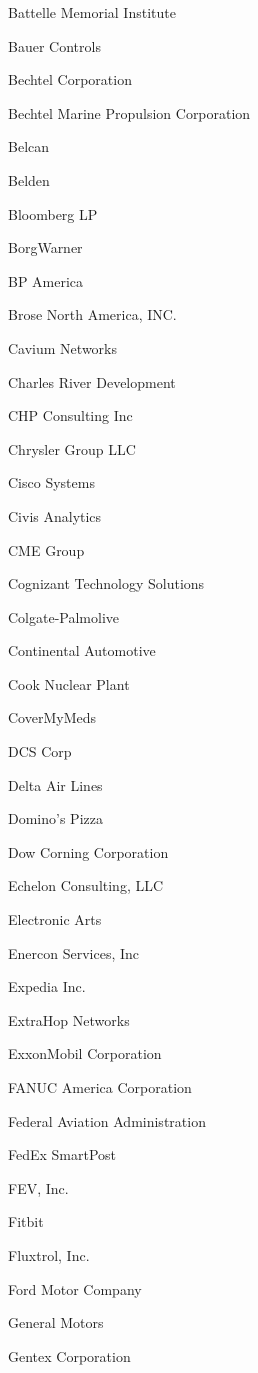 \documentclass[twoside]{article}
\begin{document}
\begin{center}
\begin{multicols}{5}
\begin{FlushLeft}
\begin{compactitem}
\item Battelle Memorial Institute
\item Bauer Controls
\item Bechtel Corporation
\item Bechtel Marine Propulsion Corporation
\item Belcan
\item Belden
\item Bloomberg LP
\item BorgWarner
\item BP America
\item Brose North America, INC.
\item Cavium Networks
\item Charles River Development
\item CHP Consulting Inc
\item Chrysler Group LLC
\item Cisco Systems
\item Civis Analytics
\item CME Group
\item Cognizant Technology Solutions
\item Colgate-Palmolive
\item Continental Automotive
\item Cook Nuclear Plant
\item CoverMyMeds
\item DCS Corp
\item Delta Air Lines
\item Domino's Pizza
\item Dow Corning Corporation
\item Echelon Consulting, LLC
\item Electronic Arts
\item Enercon Services, Inc
\item Expedia Inc.
\item ExtraHop Networks
\item ExxonMobil Corporation
\item FANUC America Corporation
\item Federal Aviation Administration
\item FedEx SmartPost
\item FEV, Inc.
\item Fitbit
\item Fluxtrol, Inc.
\item Ford Motor Company
\item General Motors
\item Gentex Corporation

\end{compactitem}
\end{FlushLeft}
\end{multicols}
\end{center}
\end{document}
